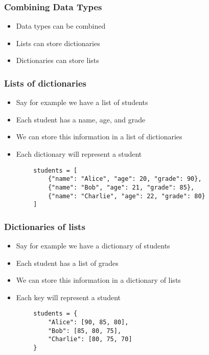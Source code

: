 \documentclass[serif, 9pt, aspectratio=32]{beamer}
\begin{document}
\begin{frame}
    \centering
    \frametitle{Combining Data Types}
    \begin{itemize}
        \setlength{\itemsep}{3em}
        \item Data types can be combined
        \item Lists can store dictionaries
        \item Dictionaries can store lists
    \end{itemize}
\end{frame}

\begin{frame}
    \centering
    \frametitle{Lists of dictionaries}
    \begin{itemize}
        \setlength{\itemsep}{3em}
        \item Say for example we have a list of students
        \item Each student has a name, age, and grade
        \item We can store this information in a list of dictionaries
        \item Each dictionary will represent a student
    \end{itemize}
\end{frame}

\begin{frame}[fragile]
    \begin{lstlisting}
        students = [
            {"name": "Alice", "age": 20, "grade": 90},
            {"name": "Bob", "age": 21, "grade": 85},
            {"name": "Charlie", "age": 22, "grade": 80}
        ]
    \end{lstlisting}
\end{frame}

\begin{frame}
    \centering
    \frametitle{Dictionaries of lists}
    \begin{itemize}
        \setlength{\itemsep}{3em}
        \item Say for example we have a dictionary of students
        \item Each student has a list of grades
        \item We can store this information in a dictionary of lists
        \item Each key will represent a student
    \end{itemize}
\end{frame}

\begin{frame}[fragile]
    \begin{lstlisting}
        students = {
            "Alice": [90, 85, 80],
            "Bob": [85, 80, 75],
            "Charlie": [80, 75, 70]
        }
    \end{lstlisting}
\end{frame}
\end{document}
